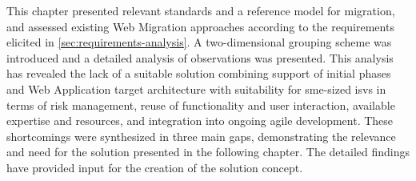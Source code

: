 This chapter presented relevant standards and a reference model for migration, and assessed existing \gls{Web Migration} approaches according to the requirements elicited in \cref{sec:requirements-analysis}.
A two-dimensional grouping scheme was introduced and a detailed analysis of observations was presented.
This analysis has revealed the lack of a suitable solution combining support of initial phases and \gls{Web Application} target architecture with suitability for \gls{sme}-sized \glspl{isv} in terms of \gls{risk management}, reuse of functionality and user interaction, available expertise and resources, and integration into ongoing agile development.
These shortcomings were synthesized in three main gaps, demonstrating the relevance and need for the solution presented in the following chapter.
The detailed findings have provided input for the creation of the solution concept.

